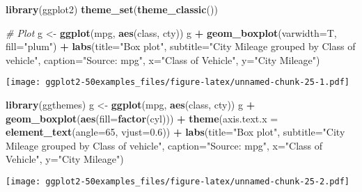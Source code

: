 \documentclass[a4paper]{article}
\newenvironment{Shaded}{\begin{snugshade}}{\end{snugshade}}
\newcommand{\KeywordTok}[1]{\textcolor[rgb]{0.13,0.29,0.53}{\textbf{#1}}}
\newcommand{\DataTypeTok}[1]{\textcolor[rgb]{0.13,0.29,0.53}{#1}}
\newcommand{\DecValTok}[1]{\textcolor[rgb]{0.00,0.00,0.81}{#1}}
\newcommand{\FloatTok}[1]{\textcolor[rgb]{0.00,0.00,0.81}{#1}}
\newcommand{\StringTok}[1]{\textcolor[rgb]{0.31,0.60,0.02}{#1}}
\newcommand{\CommentTok}[1]{\textcolor[rgb]{0.56,0.35,0.01}{\textit{#1}}}
\newcommand{\OperatorTok}[1]{\textcolor[rgb]{0.81,0.36,0.00}{\textbf{#1}}}
\newcommand{\NormalTok}[1]{#1}
\begin{document}
\begin{Shaded}
\begin{Highlighting}[]
\KeywordTok{library}\NormalTok{(ggplot2)}
\KeywordTok{theme_set}\NormalTok{(}\KeywordTok{theme_classic}\NormalTok{())}

\CommentTok{# Plot}
\NormalTok{g <-}\StringTok{ }\KeywordTok{ggplot}\NormalTok{(mpg, }\KeywordTok{aes}\NormalTok{(class, cty))}
\NormalTok{g }\OperatorTok{+}\StringTok{ }\KeywordTok{geom_boxplot}\NormalTok{(}\DataTypeTok{varwidth=}\NormalTok{T, }\DataTypeTok{fill=}\StringTok{"plum"}\NormalTok{) }\OperatorTok{+}\StringTok{ }
\StringTok{    }\KeywordTok{labs}\NormalTok{(}\DataTypeTok{title=}\StringTok{"Box plot"}\NormalTok{, }
         \DataTypeTok{subtitle=}\StringTok{"City Mileage grouped by Class of vehicle"}\NormalTok{,}
         \DataTypeTok{caption=}\StringTok{"Source: mpg"}\NormalTok{,}
         \DataTypeTok{x=}\StringTok{"Class of Vehicle"}\NormalTok{,}
         \DataTypeTok{y=}\StringTok{"City Mileage"}\NormalTok{)}
\end{Highlighting}
\end{Shaded}

\texttt{[image: ggplot2-50examples\_files/figure-latex/unnamed-chunk-25-1.pdf]}

\begin{Shaded}
\begin{Highlighting}[]
\KeywordTok{library}\NormalTok{(ggthemes)}
\NormalTok{g <-}\StringTok{ }\KeywordTok{ggplot}\NormalTok{(mpg, }\KeywordTok{aes}\NormalTok{(class, cty))}
\NormalTok{g }\OperatorTok{+}\StringTok{ }\KeywordTok{geom_boxplot}\NormalTok{(}\KeywordTok{aes}\NormalTok{(}\DataTypeTok{fill=}\KeywordTok{factor}\NormalTok{(cyl))) }\OperatorTok{+}\StringTok{ }
\StringTok{  }\KeywordTok{theme}\NormalTok{(}\DataTypeTok{axis.text.x =} \KeywordTok{element_text}\NormalTok{(}\DataTypeTok{angle=}\DecValTok{65}\NormalTok{, }\DataTypeTok{vjust=}\FloatTok{0.6}\NormalTok{)) }\OperatorTok{+}\StringTok{ }
\StringTok{  }\KeywordTok{labs}\NormalTok{(}\DataTypeTok{title=}\StringTok{"Box plot"}\NormalTok{, }
       \DataTypeTok{subtitle=}\StringTok{"City Mileage grouped by Class of vehicle"}\NormalTok{,}
       \DataTypeTok{caption=}\StringTok{"Source: mpg"}\NormalTok{,}
       \DataTypeTok{x=}\StringTok{"Class of Vehicle"}\NormalTok{,}
       \DataTypeTok{y=}\StringTok{"City Mileage"}\NormalTok{)}
\end{Highlighting}
\end{Shaded}

\texttt{[image: ggplot2-50examples\_files/figure-latex/unnamed-chunk-25-2.pdf]}
\newpage
\end{document}
